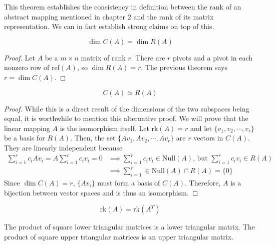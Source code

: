   This theorem establishes the consistency in definition between the rank of an abstract mapping mentioned in chapter 2 and the rank of its matrix representation. We can in fact establish strong claims on top of this. 

  \begin{theorem} 
    \begin{equation}
      \dim C(A) = \dim R(A)
    \end{equation}
  \end{theorem}
  \begin{proof}
    Let $A$ be a $m \times n$ matrix of rank $r$. There are $r$ pivots and a pivot in each nonzero row of ref$(A)$, so $\dim R(A) = r$. The previous theorem says $r = \dim C(A)$. 
  \end{proof}

  \begin{corollary}
    \begin{equation}
      C(A) \simeq R(A)
    \end{equation}
  \end{corollary}
  \begin{proof}
    While this is a direct result of the dimensions of the two subspaces being equal, it is worthwhile to mention this alternative proof. We will prove that the linear mapping $A$ is the isomorphism itself. Let rk$(A) = r$ and let $\{ v_1, v_2, \cdots, v_r\}$ be a basis for $R(A)$. Then, the set $\{ A v_1, A v_2, \cdots, A v_r\}$ are $r$ vectors in $C(A)$. They are linearly independent because 
    \begin{align*}
      \sum_{i = 1}^r c_i A v_i = A \sum_{i=1}^r c_i v_i = 0 & \implies \sum_{i=1}^r c_i v_i \in \text{Null}(A) \text{, but } \sum_{i=1}^r c_i v_i \in R(A) \\
      & \implies \sum_{i=1}^r \in \text{Null}(A) \cap R(A) = \{0\}
    \end{align*} 
    Since $\dim C(A) = r$, $\{A v_i\}$ must form a basis of $C(A)$. Therefore, $A$ is a bijection between vector spaces and is thus an isomorphism. 
  \end{proof}

  \begin{corollary}
    \begin{equation}
      \text{rk}(A) = \text{rk}(A^T)
    \end{equation}
  \end{corollary}

  \begin{theorem}
    The product of square lower triangular matrices is a lower triangular matrix. The product of square upper triangular matrices is an upper triangular matrix. 
  \end{theorem}

